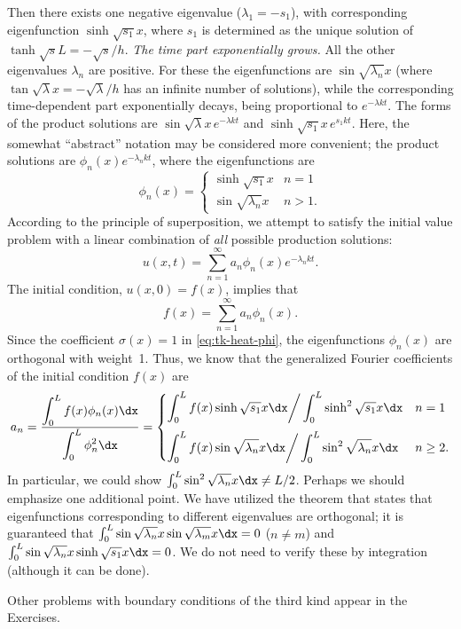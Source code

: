 Then there exists one negative eigenvalue ($\lambda_1 = -s_1$), with corresponding eigenfunction $\sinh\sqrt{s_1}x$, where $s_1$ is determined as the unique solution of $\tanh\sqrt{s}L = -\sqrt{s}/h$.  \textit{The time part exponentially grows.}  All the other eigenvalues $\lambda_n$ are positive.  For these the eigenfunctions are $\sin\sqrt{\lambda_n}x$ (where $\tan\sqrt{\lambda}x = -\sqrt{\lambda}/h$ has an infinite number of solutions), while the corresponding time-dependent part exponentially decays, being proportional to $e^{-\lambda kt}$.  The forms of the product solutions are $\sin\sqrt{\lambda}x\,e^{-\lambda kt}$ and $\sinh\sqrt{s_1}x\,e^{s_1kt}$.  Here, the somewhat ``abstract'' notation may be considered more convenient; the product solutions are $\phi_n(x)e^{-\lambda_n kt}$, where the eigenfunctions are
\[
\phi_n(x) = \begin{cases} \sinh\sqrt{s_1}x & n = 1 \\ \sin\sqrt{\lambda_n}x & n > 1. \end{cases}
\]
According to the principle of superposition, we attempt to satisfy the initial value problem with a linear combination of \textit{all} possible production solutions:
\[
u(x,t) = \sum_{n=1}^{\infty} a_n\phi_n(x)e^{-\lambda_n kt}.
\]
The initial condition, $u(x,0) = f(x)$, implies that
\[
f(x) = \sum_{n=1}^{\infty} a_n\phi_n(x).
\]
Since the coefficient $\sigma(x) = 1$ in \eqref{eq:tk-heat-phi}, the eigenfunctions $\phi_n(x)$ are orthogonal with weight~1.  Thus, we know that the generalized Fourier coefficients of the initial condition $f(x)$ are
\[
a_n = \frac{\displaystyle\int_0^L f(x)\phi_n(x)\dx}{\displaystyle\int_0^L \phi_n^2\dx} = \begin{cases} \displaystyle\int_0^L f(x)\sinh\sqrt{s_1}x\dx \bigg/ \int_0^L \sinh^2\sqrt{s_1}x\dx & n = 1 \\[12pt] \displaystyle\int_0^L f(x)\sin\sqrt{\lambda_n}x\dx \bigg/ \int_0^L \sin^2\sqrt{\lambda_n}x\dx & n \ge 2. \end{cases}
\]
In particular, we could show $\int_0^L \sin^2\sqrt{\lambda_n}x\dx \neq L/2$.  Perhaps we should emphasize one additional point.  We have utilized the theorem that states that eigenfunctions corresponding to different eigenvalues are orthogonal; it is guaranteed that $\int_0^L \sin\sqrt{\lambda_n}x\sin\sqrt{\lambda_m}x\dx = 0$ ($n \neq m$) and $\int_0^L \sin\sqrt{\lambda_n}x\sinh\sqrt{s_1}x\dx = 0$.  We do not need to verify these by integration (although it can be done).

Other problems with boundary conditions of the third kind appear in the Exercises.

